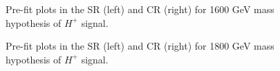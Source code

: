 \begin{figure}[H]
  \centering
  \caption{Pre-fit plots in the SR (left) and CR (right) for 1600 GeV mass hypothesis of $H^{+}$ signal.}
  \label{fig:Prefit_Hp1600_Asimov}
\end{figure}
\begin{figure}[H]
  \centering
  \caption{Pre-fit plots in the SR (left) and CR (right) for 1800 GeV mass hypothesis of $H^{+}$ signal.}
  \label{fig:Prefit_Hp1800_Asimov}
\end{figure}
